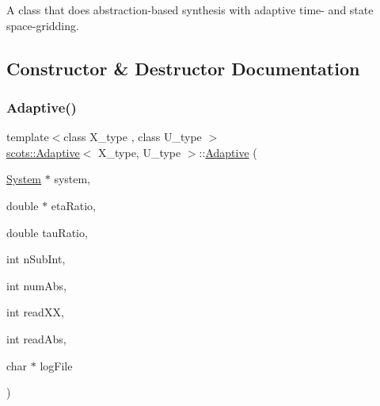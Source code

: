 A class that does abstraction-\/based synthesis with adaptive time-\/ and state space-\/gridding. 

\subsection{Constructor \& Destructor Documentation}
\mbox{\label{classscots_1_1Adaptive_a376630f4de5c90857e243c305e3aaa53}} 
\subsubsection{\texorpdfstring{Adaptive()}{Adaptive()}}
{\footnotesize\ttfamily template$<$class X\+\_\+type , class U\+\_\+type $>$ \\
\hyperlink{classscots_1_1Adaptive}{scots\+::\+Adaptive}$<$ X\+\_\+type, U\+\_\+type $>$\+::\hyperlink{classscots_1_1Adaptive}{Adaptive} (\begin{DoxyParamCaption}\item[{\hyperlink{classscots_1_1System}{System} $\ast$}]{system,  }\item[{double $\ast$}]{eta\+Ratio,  }\item[{double}]{tau\+Ratio,  }\item[{int}]{n\+Sub\+Int,  }\item[{int}]{num\+Abs,  }\item[{int}]{read\+XX,  }\item[{int}]{read\+Abs,  }\item[{char $\ast$}]{log\+File }\end{DoxyParamCaption})\hspace{0.3cm}{\ttfamily [inline]}}

